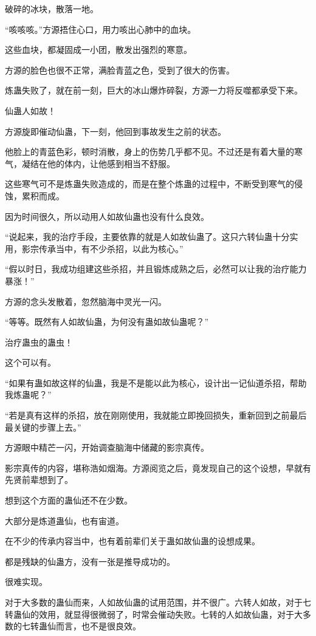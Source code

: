 
\begin{this_body}

破碎的冰块，散落一地。

“咳咳咳。”方源捂住心口，用力咳出心肺中的血块。

这些血块，都凝固成一小团，散发出强烈的寒意。

方源的脸色也很不正常，满脸青蓝之色，受到了很大的伤害。

炼蛊失败了，就在前一刻，巨大的冰山爆炸碎裂，方源一力将反噬都承受下来。

仙蛊人如故！

方源旋即催动仙蛊，下一刻，他回到事故发生之前的状态。

他脸上的青蓝色彩，顿时消散，身上的伤势几乎都不见。不过还是有着大量的寒气，凝结在他的体内，让他感到相当不舒服。

这些寒气可不是炼蛊失败造成的，而是在整个炼蛊的过程中，不断受到寒气的侵蚀，累积而成。

因为时间很久，所以动用人如故仙蛊也没有什么良效。

“说起来，我的治疗手段，主要依靠的就是人如故仙蛊了。这只六转仙蛊十分实用，影宗传承当中，有不少杀招，以此为核心。”

“假以时日，我成功组建这些杀招，并且锻炼成熟之后，必然可以让我的治疗能力暴涨！”

方源的念头发散着，忽然脑海中灵光一闪。

“等等。既然有人如故仙蛊，为何没有蛊如故仙蛊呢？”

治疗蛊虫的蛊虫！

这个可以有。

“如果有蛊如故这样的仙蛊，我是不是能以此为核心，设计出一记仙道杀招，帮助我炼蛊呢？”

“若是真有这样的杀招，放在刚刚使用，我就能立即挽回损失，重新回到之前最后最关键的步骤上去。”

方源眼中精芒一闪，开始调查脑海中储藏的影宗真传。

影宗真传的内容，堪称浩如烟海。方源阅览之后，竟发现自己的这个设想，早就有先贤前辈想到了。

想到这个方面的蛊仙还不在少数。

大部分是炼道蛊仙，也有宙道。

在不少的传承内容当中，也有着前辈们关于蛊如故仙蛊的设想成果。

都是残缺的仙蛊方，没有一张是推导成功的。

很难实现。

对于大多数的蛊仙而来，人如故仙蛊的试用范围，并不很广。六转人如故，对于七转蛊仙的效用，就显得很微弱了，时常会催动失败。七转的人如故仙蛊，对于大多数的七转蛊仙而言，也不是很良效。


\end{this_body}
